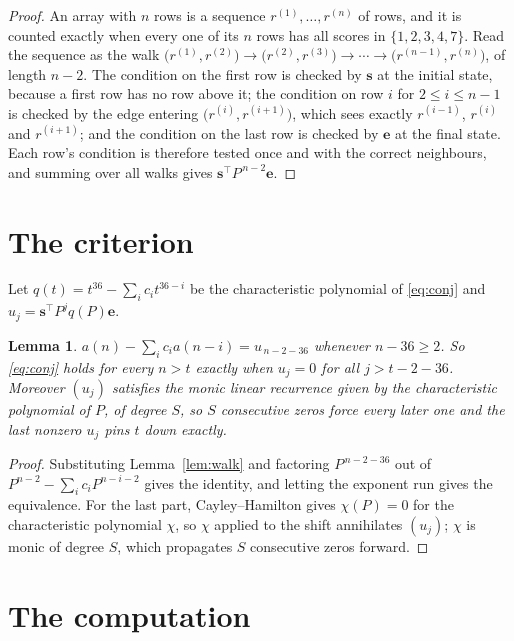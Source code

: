 \documentclass[11pt,a4paper]{article}
\theoremstyle{plain}
\newtheorem{lemma}[theorem]{Lemma}
\theoremstyle{definition}
\begin{document}
\begin{proof}
An array with $n$ rows is a sequence $r^{(1)},\dots,r^{(n)}$ of rows, and it is counted
exactly when every one of its $n$ rows has all scores in $\{1,2,3,4,7\}$. Read the sequence as the
walk $\bigl(r^{(1)},r^{(2)}\bigr)\to\bigl(r^{(2)},r^{(3)}\bigr)\to\cdots\to
\bigl(r^{(n-1)},r^{(n)}\bigr)$, of length $n-2$. The condition on the first row is
checked by $\mathbf{s}$ at the initial state, because a first row has no row above it; the
condition on row $i$ for $2\le i\le n-1$ is checked by the edge entering
$\bigl(r^{(i)},r^{(i+1)}\bigr)$, which sees exactly $r^{(i-1)}$, $r^{(i)}$ and
$r^{(i+1)}$; and the condition on the last row is checked by $\mathbf{e}$ at the final
state. Each row's condition is therefore tested once and with the correct neighbours, and
summing over all walks gives $\mathbf{s}^{\!\top}P^{\,n-2}\mathbf{e}$.
\end{proof}

\section{The criterion}

Let $q(t)=t^{36}-\sum_i c_i t^{36-i}$ be the characteristic polynomial of
\eqref{eq:conj} and $u_j=\mathbf{s}^{\!\top}P^{j}q(P)\mathbf{e}$.

\begin{lemma}\label{lem:crit}
$a(n)-\sum_i c_i a(n-i)=u_{\,n-2-36}$ whenever $n-36\ge2$. So \eqref{eq:conj}
holds for every $n>t$ exactly when $u_j=0$ for all $j>t-2-36$. Moreover $(u_j)$
satisfies the monic linear recurrence given by the characteristic polynomial of $P$, of
degree $S$, so $S$ consecutive zeros force every later one and the last nonzero $u_j$ pins
$t$ down exactly.
\end{lemma}

\begin{proof}
Substituting Lemma~\ref{lem:walk} and factoring $P^{\,n-2-36}$ out of
$P^{n-2}-\sum_i c_i P^{n-i-2}$ gives the identity, and letting the exponent run gives the
equivalence. For the last part, Cayley--Hamilton gives $\chi(P)=0$ for the characteristic
polynomial $\chi$, so $\chi$ applied to the shift annihilates $(u_j)$; $\chi$ is monic of
degree $S$, which propagates $S$ consecutive zeros forward.
\end{proof}

\section{The computation}
\end{document}

